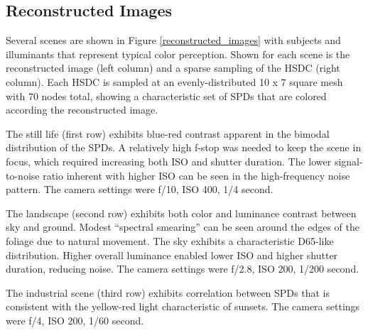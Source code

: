 \documentclass[twocolumn,10pt]{asme2ej}
\newcommand{\id}{\hspace{6 mm}}
\begin{document}

\clearpage

\subsection{Reconstructed Images}


Several scenes are shown in Figure \ref{reconstructed_images} with subjects and illuminants that represent typical color perception. Shown for each scene is the reconstructed image (left column) and a sparse sampling of the HSDC (right column). Each HSDC is sampled at an evenly-distributed 10 x 7 square mesh with 70 nodes total, showing a characteristic set of SPDs that are colored according the reconstructed image.

\id The still life (first row) exhibits blue-red contrast apparent in the bimodal distribution of the SPDs. A relatively high f-stop was needed to keep the scene in focus, which required increasing both ISO and shutter duration. The lower signal-to-noise ratio inherent with higher ISO can be seen in the high-frequency noise pattern. The camera settings were f/10, ISO 400, 1/4 second.

\id The landscape (second row) exhibits both color and luminance contrast between sky and ground. Modest ``spectral smearing'' can be seen around the edges of the foliage due to natural movement. The sky exhibits a characteristic D65-like distribution. Higher overall luminance enabled lower ISO and higher shutter duration, reducing noise. The camera settings were f/2.8, ISO 200, 1/200 second.

\id The industrial scene (third row) exhibits correlation between SPDs that is consistent with the yellow-red light characteristic of sunsets. The camera settings were f/4, ISO 200, 1/60 second.

\vfill
\end{document}
